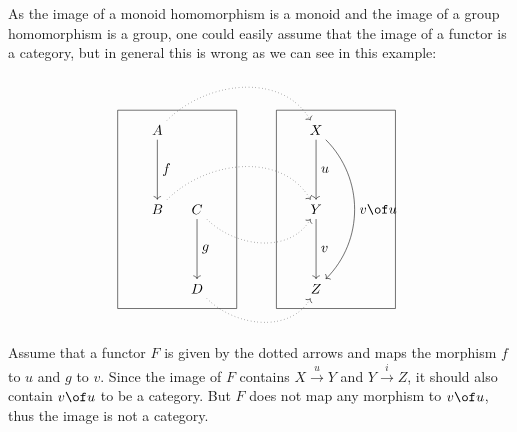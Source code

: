 \documentclass{article}
\theoremstyle{definition}
\begin{document}
As the image of a monoid homomorphism is a monoid and the image of a group homomorphism is a group, one could easily assume that the image of a functor is a category, but in general this is wrong as we can see in this example:
\[ \begin{tikzpicture}
  \draw (0, 0) rectangle (3, 5);
  \node (A) at (1, 4.5) {$A$};
  \node (B) at (1, 2.5) {$B$};
  \node (C) at (2, 2.5) {$C$};
  \node (D) at (2, 0.5) {$D$};
  \draw[->] (A) to node[auto] {$f$} (B);
  \draw[->] (C) to node[auto] {$g$} (D);

  \draw (4, 0) rectangle (7, 5);
  \node (X) at (5, 4.5) {$X$};
  \node (Y) at (5, 2.5) {$Y$};
  \node (Z) at (5, 0.5) {$Z$};
  \draw[->] (X) to node[auto] {$u$} (Y);
  \draw[->] (Y) to node[auto] {$v$} (Z);
  \draw[->, bend left=45] (X) to node[auto] {$v \of u$} (Z);

  \draw[->, dotted, in=120, out=45] (A) to (X);
  \draw[->, dotted, in=120, out=45] (B) to (Y);
  \draw[->, dotted, in=-120, out=-45] (C) to (Y);
  \draw[->, dotted, in=-120, out=-45] (D) to (Z);
\end{tikzpicture} \]
Assume that a functor $F$ is given by the dotted arrows and maps the morphism $f$ to $u$ and $g$ to $v$.
Since the image of $F$ contains $X \xrightarrow{u} Y$ and $Y \xrightarrow{i} Z$, it should also contain $v \of u$ to be a category.
But $F$ does not map any morphism to $v \of u$, thus the image is not a category.
\end{document}

